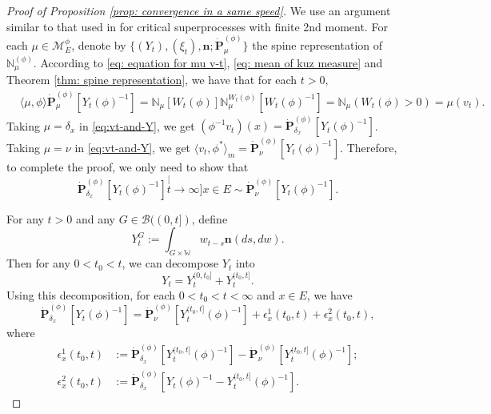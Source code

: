 \documentclass[12pt, a4paper]{amsart}
\theoremstyle{definition}
\numberwithin{equation}{section}
\begin{document}
\begin{proof}[Proof of Proposition \ref{prop: convergence in a same speed}]
	We use an argument similar to that used in \cite{RenSongSun2017Spine} for critical superprocesses with finite 2nd moment.
	For each $\mu\in\mathcal M^\phi_E$, denote by $\{(Y_t), (\xi_t),\mathbf n; \dot {\mathbf P}^{(\phi)}_\mu\}$ the spine representation of $\mathbb N^{(\phi)}_\mu$.
	According to \eqref	{eq: equation for mu v-t}, \eqref{eq: mean of kuz measure} and Theorem \ref{thm: spine representation},
	we have that for each $t>0$,
\begin{equation}\begin{split}\label{eq:vt-and-Y}
	&\langle \mu,\phi \rangle \dot {\mathbf P}^{(\phi)}_\mu [Y_t(\phi)^{-1}]
	= \mathbb N_\mu[W_t(\phi)] \mathbb N^{W_t(\phi)}_\mu [W_t(\phi)^{-1}]
	= \mathbb N_\mu(W_t(\phi) > 0)
	= \mu(v_t).
\end{split}\end{equation}
	Taking $\mu = \delta_x$ in \eqref{eq:vt-and-Y}, we get $(\phi^{-1}v_t)(x) =\dot{\mathbf P}_{\delta_x}^{(\phi)}[Y_t(\phi)^{-1}]$.
	Taking $\mu = \nu$ in \eqref{eq:vt-and-Y}, we get $\langle v_t, \phi^*\rangle_m = \dot {\mathbf P}_{\nu}^{(\phi)} [Y_t(\phi)^{-1}]$.
	Therefore, to complete the proof, we only need to show that
\begin{equation}
	\dot{\mathbf P}_{\delta_x}^{(\phi)}[Y_t(\phi)^{-1}]
	\stackrel[t\to \infty]{x\in E}{\sim}  \dot {\mathbf P}_\nu^{(\phi)} [Y_t(\phi)^{-1}].
\end{equation}

	For any $t>0$ and any $G\in \mathscr B((0,t])$, define
\begin{equation}
	Y^G_t
	:= \int_{G\times \mathbb W} w_{t-s} \mathbf n(ds,dw).
\end{equation}
	Then for any $0 < t_0 < t$, we can decompose $Y_t$ into
\begin{equation}
	Y_t
	= Y^{(0,t_0]}_t + Y^{(t_0,t]}_t.
\end{equation}
	Using this decomposition, for each $0<t_0<t<\infty$ and $x\in E$, we have
\begin{equation}\label{eq: starting point of phi-1v_t(x)}
	 \dot{\mathbf P}_{\delta_x}^{(\phi)}[Y_t(\phi)^{-1}]
	= \dot {\mathbf P}_\nu^{(\phi)} [Y^{(t_0,t]}_t(\phi)^{-1}] + \epsilon_x^1(t_0,t) +\epsilon_x^2(t_0,t),
\end{equation}
	where
\begin{equation}\begin{split}
	\epsilon_x^1(t_0,t)
	&:= \dot {\mathbf P}_{\delta_x}^{(\phi)} [Y^{(t_0,t]}_t(\phi)^{-1}] - \dot {\mathbf P}_\nu^{(\phi)} [Y^{(t_0,t]}_t(\phi)^{-1}];
	\\\epsilon_x^2(t_0,t)
	&:= \dot{\mathbf P}_{\delta_x}^{(\phi)}[Y_t(\phi)^{-1} - Y^{(t_0,t]}_t(\phi)^{-1}].
\end{split}\end{equation}


\end{proof}
\end{document}

